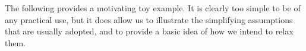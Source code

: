 \documentclass[10pt,a4paper]{paper}
\theoremstyle{definition}
\begin{document}




The following provides a motivating toy example. 
It is clearly too simple to be of any practical use, but it does allow us to illustrate the simplifying assumptions that are usually adopted, and to provide a basic idea of how we intend to relax them.

\vspace{10pt}
\end{document}
